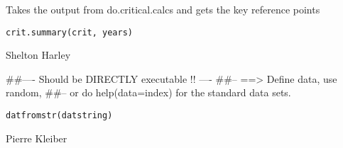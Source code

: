 \documentclass[a4paper]{book}
\begin{document}
%
\begin{Description}\relax

Takes the output from do.critical.calcs and gets the key reference points
\end{Description}
%
\begin{Usage}
\begin{verbatim}
crit.summary(crit, years)
\end{verbatim}
\end{Usage}
%
\begin{Arguments}
\begin{ldescription}
\item[\code{crit}] 


\item[\code{years}] 


\end{ldescription}
\end{Arguments}
%
\begin{Author}\relax
Shelton Harley

\end{Author}
%
\begin{Examples}
\begin{ExampleCode}
##---- Should be DIRECTLY executable !! ----
##-- ==>  Define data, use random,
##--	or do  help(data=index)  for the standard data sets.

\end{ExampleCode}
\end{Examples}
%
\begin{Usage}
\begin{verbatim}
datfromstr(datstring)
\end{verbatim}
\end{Usage}
%
\begin{Arguments}
\begin{ldescription}
\item[\code{datstring}] 


\end{ldescription}
\end{Arguments}
%
\begin{Author}\relax
Pierre Kleiber

\end{Author}
\end{document}
